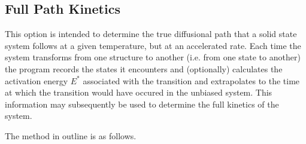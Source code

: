 \subsection{Full Path Kinetics}
\label{FPK}
 This option is intended to
determine the true diffusional path that a solid state system follows at a
given temperature, but at an accelerated rate.  Each time the system
transforms from one structure to another (i.e. from one state to another) the
program records the states it encounters and (optionally) calculates the
activation energy $E^{*}$ associated with the transition and extrapolates to
the time at which the transition would have occured in the unbiased system.
This information may subsequently be used to determine the full kinetics of
the system.

The method in outline is as follows. 
